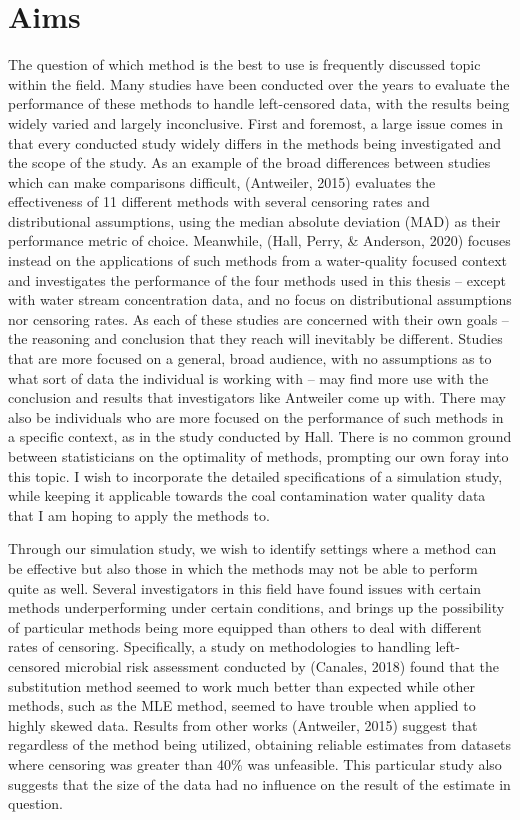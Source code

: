 \documentclass[12pt, twoside]{amherstthesis}
\begin{document}
\hypertarget{aims}{%
\section{Aims}\label{aims}}

The question of which method is the best to use is frequently discussed topic within the field. Many studies have been conducted over the years to evaluate the performance of these methods to handle left-censored data, with the results being widely varied and largely inconclusive. First and foremost, a large issue comes in that every conducted study widely differs in the methods being investigated and the scope of the study. As an example of the broad differences between studies which can make comparisons difficult, (Antweiler, 2015) evaluates the effectiveness of 11 different methods with several censoring rates and distributional assumptions, using the median absolute deviation (MAD) as their performance metric of choice. Meanwhile, (Hall, Perry, \& Anderson, 2020) focuses instead on the applications of such methods from a water-quality focused context and investigates the performance of the four methods used in this thesis -- except with water stream concentration data, and no focus on distributional assumptions nor censoring rates. As each of these studies are concerned with their own goals -- the reasoning and conclusion that they reach will inevitably be different. Studies that are more focused on a general, broad audience, with no assumptions as to what sort of data the individual is working with -- may find more use with the conclusion and results that investigators like Antweiler come up with. There may also be individuals who are more focused on the performance of such methods in a specific context, as in the study conducted by Hall. There is no common ground between statisticians on the optimality of methods, prompting our own foray into this topic. I wish to incorporate the detailed specifications of a simulation study, while keeping it applicable towards the coal contamination water quality data that I am hoping to apply the methods to.

Through our simulation study, we wish to identify settings where a method can be effective but also those in which the methods may not be able to perform quite as well. Several investigators in this field have found issues with certain methods underperforming under certain conditions, and brings up the possibility of particular methods being more equipped than others to deal with different rates of censoring. Specifically, a study on methodologies to handling left-censored microbial risk assessment conducted by (Canales, 2018) found that the substitution method seemed to work much better than expected while other methods, such as the MLE method, seemed to have trouble when applied to highly skewed data. Results from other works (Antweiler, 2015) suggest that regardless of the method being utilized, obtaining reliable estimates from datasets where censoring was greater than 40\% was unfeasible. This particular study also suggests that the size of the data had no influence on the result of the estimate in question.
\end{document}
